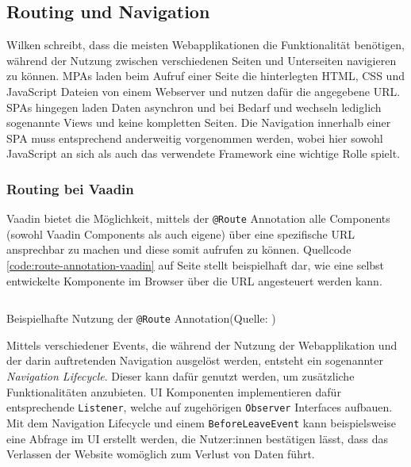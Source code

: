 \documentclass[a4paper,12pt,twoside]{scrreprt}
\begin{document}
\subsection{Routing und Navigation}
\label{sub-sec:routing-navigation}
Wilken schreibt, dass die meisten Webapplikationen die Funktionalität benötigen, während der Nutzung zwischen verschiedenen Seiten und Unterseiten navigieren zu können. \acp{MPA} laden beim Aufruf einer Seite die hinterlegten HTML, \ac{CSS} und JavaScript Dateien von einem Webserver und nutzen dafür die angegebene URL. \acp{SPA} hingegen laden Daten asynchron und bei Bedarf und wechseln lediglich sogenannte Views und keine kompletten Seiten. Die Navigation innerhalb einer \ac{SPA} muss entsprechend anderweitig vorgenommen werden, wobei hier sowohl JavaScript an sich als auch das verwendete Framework eine wichtige Rolle spielt. \parencite[][Seite 159f.]{wilken_angular_2018}

\subsubsection{Routing bei Vaadin}
\label{sub-sub-sec:routing-herangehensweise-vaadin}
Vaadin bietet die Möglichkeit, mittels der \texttt{@Route} Annotation alle Components (sowohl Vaadin Components als auch eigene) über eine spezifische URL ansprechbar zu machen und diese somit aufrufen zu können. Quellcode \ref{code:route-annotation-vaadin} auf Seite \pageref{code:route-annotation-vaadin} stellt beispielhaft dar, wie eine selbst entwickelte Komponente im Browser über die URL  angesteuert werden kann. \parencite[][Using the @Route Annotation]{vaadin_ltd_overview_2021-1}

\begin{listing}[ht]
    \inputminted[fontsize=\footnotesize,linenos]{java}{code/Vaadin_Route-annotation.java}
    \caption[Beispielhafte Nutzung der \texttt{@Route} Annotation]{Beispielhafte Nutzung der \texttt{@Route} Annotation\newline(Quelle: \cite[][Using the @Route Annotation]{vaadin_ltd_overview_2021-1})}
    \label{code:route-annotation-vaadin}
\end{listing}

Mittels verschiedener Events, die während der Nutzung der Webapplikation und der darin auftretenden Navigation ausgelöst werden, entsteht ein sogenannter \textit{Navigation Lifecycle}. Dieser kann dafür genutzt werden, um zusätzliche Funktionalitäten anzubieten. UI Komponenten implementieren dafür entsprechende \texttt{Listener}, welche auf zugehörigen \texttt{Observer} Interfaces aufbauen. Mit dem Navigation Lifecycle und einem \texttt{BeforeLeaveEvent} kann beispielsweise eine Abfrage im \acl{UI} erstellt werden, die Nutzer:innen bestätigen lässt, dass das Verlassen der Website womöglich zum Verlust von Daten führt. \parencite[][]{vaadin_ltd_navigation_2021}
\end{document}
